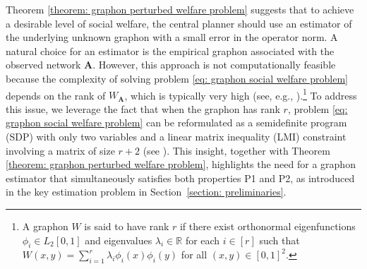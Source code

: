 \documentclass[11pt]{article}
\newcommand{\<}{\langle}
\renewcommand{\>}{\rangle}
\theoremstyle{plain}
\theoremstyle{definition}
\theoremstyle{remark}
\begin{document}
Theorem \ref{theorem: graphon perturbed welfare problem} suggests that to achieve a desirable level of social welfare, the central planner should use an estimator of the underlying unknown graphon with a small error in the operator norm. 
 A natural choice for an estimator is the empirical graphon associated with the observed network \( \mathbf{A} \). However, this approach is not computationally feasible because the complexity of solving problem \eqref{eq: graphon social welfare problem} depends on the rank of \( W_{\mathbf{A}} \), which is typically very high (see, e.g., \citep{vu_rank_adjencency}).\footnote{A graphon \( W \) is said to have rank \( r \) if there exist orthonormal eigenfunctions \( \phi_i \in L_2[0,1] \) and eigenvalues \( \lambda_i \in \mathbb{R} \) for each \( i \in [r] \) such that \( W(x,y) = \sum_{i = 1}^r \lambda_i \phi_i(x) \phi_i(y) \) for all \( (x,y) \in [0,1]^2 \).}  
To address this issue, we leverage the fact that when the graphon has rank \( r \), problem \eqref{eq: graphon social welfare problem} can be reformulated as a semidefinite program (SDP) with only two variables and a linear matrix inequality (LMI) constraint involving a matrix of size \( r+2 \) (see \citep[footnote 14]{Parise_Ozdaglar_Econometrica}). This insight, together with Theorem \ref{theorem: graphon perturbed welfare problem}, highlights the need for a graphon estimator that simultaneously satisfies both properties P1 and P2, as introduced in the key estimation problem in Section~\ref{section: preliminaries}.  
    
\end{document}

